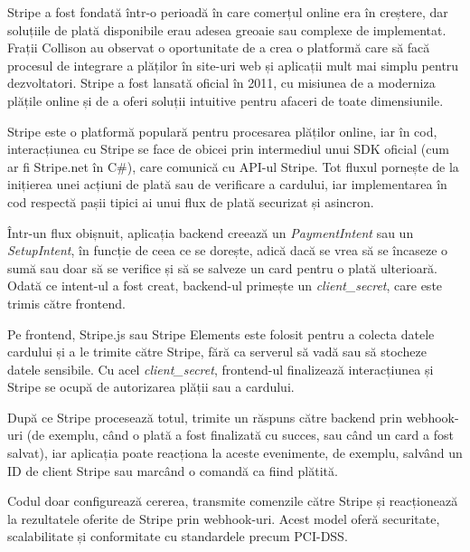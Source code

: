 Stripe a fost fondată într-o perioadă în care comerțul online era în creștere, dar soluțiile de
plată disponibile erau adesea greoaie sau complexe de implementat. Frații Collison au observat o
oportunitate de a crea o platformă care să facă procesul de integrare a plăților în site-uri web și
aplicații mult mai simplu pentru dezvoltatori. Stripe a fost lansată oficial în 2011, cu misiunea de
a moderniza plățile online și de a oferi soluții intuitive pentru afaceri de toate dimensiunile. \parencite{stripe}

Stripe este o platformă populară pentru procesarea plăților online, iar în cod, interacțiunea cu Stripe se face de obicei prin intermediul unui SDK oficial (cum ar fi Stripe.net în C\#), care comunică cu API-ul Stripe. Tot fluxul pornește de la inițierea unei acțiuni de plată sau de verificare a cardului, iar implementarea în cod respectă pașii tipici ai unui flux de plată securizat și asincron. \parencite{stripe}

Într-un flux obișnuit, aplicația backend creează un \textit{PaymentIntent} sau un \textit{SetupIntent}, în funcție de ceea ce se dorește, adică dacă se vrea să se încaseze o sumă sau doar să se verifice și să se salveze un card pentru o plată ulterioară. Odată ce intent-ul a fost creat, backend-ul primește un \textit{client\_secret}, care este trimis către frontend. \parencite{stripe}

Pe frontend, Stripe.js sau Stripe Elements este folosit pentru a colecta datele cardului și a le trimite către Stripe, fără ca serverul să vadă sau să stocheze datele sensibile. Cu acel \textit{client\_secret}, frontend-ul finalizează interacțiunea și Stripe se ocupă de autorizarea plății sau a cardului. \parencite{stripe}

După ce Stripe procesează totul, trimite un răspuns către backend prin webhook-uri (de exemplu, când o plată a fost finalizată cu succes, sau când un card a fost salvat), iar aplicația poate reacționa la aceste evenimente, de exemplu, salvând un ID de client Stripe sau marcând o comandă ca fiind plătită. \parencite{stripe}

Codul doar configurează cererea, transmite comenzile către Stripe și reacționează la rezultatele oferite de Stripe prin webhook-uri. Acest model oferă securitate, scalabilitate și conformitate cu standardele precum PCI-DSS.